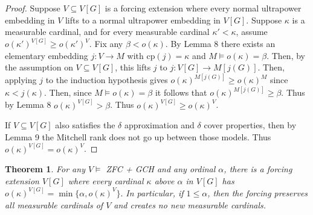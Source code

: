 \documentclass[10pt,leqno]{amsart}
\newtheorem{theorem}{Theorem}[]
\begin{document}
\begin{proof} Suppose $V \subseteq V[G]$ is a forcing extension where every normal ultrapower embedding in $V$ lifts to a normal ultrapower embedding in $V[G]$. Suppose $\kappa$ is a measurable cardinal, and for every measurable cardinal $\kappa' < \kappa$, assume $o(\kappa')^{V[G]} \ge o(\kappa')^V$. Fix any $\beta < o(\kappa)$. By Lemma 8 there exists an elementary embedding $j:V \to M$ with cp$(j)= \kappa$ and $M \models o(\kappa) = \beta$. Then, by the assumption on $V \subseteq V[G]$, this lifts $j$ to $j:V[G] \to M[j(G)]$. Then, applying $j$ to the induction hypothesis gives $o(\kappa)^{M[j(G)]} \ge o(\kappa)^M$ since $\kappa < j(\kappa)$. Then, since $M \models o(\kappa) = \beta$ it follows that $o(\kappa)^{M[j(G)]} \ge \beta$. Thus by Lemma 8 $o(\kappa)^{V[G]} > \beta$. Thus $o(\kappa)^{V[G]} \ge o(\kappa)^V$.

If $V \subseteq V[G]$ also satisfies the $\delta$ approximation and $\delta$ cover properties, then by Lemma 9 the Mitchell rank does not go up between those models. Thus $o(\kappa)^{V[G]} = o(\kappa)^V$.
\end{proof}

\begin{theorem} For any $V \models$ ZFC + GCH and any ordinal $\alpha$, there is a forcing extension $V[G]$ where every cardinal $\kappa$ above $\alpha$ in $V[G]$ has $o(\kappa)^{V[G]} = \min\{\alpha, o(\kappa)^V\}.$ In particular, if $1 \le \alpha$, then the forcing preserves all measurable cardinals of $V$ and creates no new measurable cardinals. 
\end{theorem}
\end{document}
